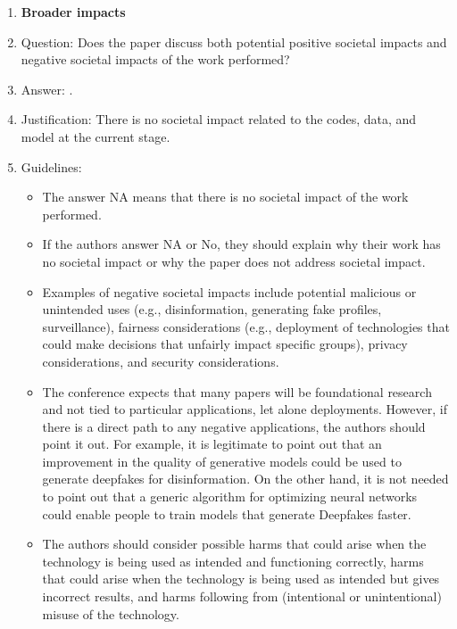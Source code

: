 \documentclass{article}
\begin{document}
\begin{enumerate}
\begin{itemize}
        \item If the authors answer No, they should explain the special circumstances that require a deviation from the Code of Ethics.
        \item The authors should make sure to preserve anonymity (e.g., if there is a special consideration due to laws or regulations in their jurisdiction).
    \end{itemize}
\item {\bf Broader impacts}
    \item[] Question: Does the paper discuss both potential positive societal impacts and negative societal impacts of the work performed?
    \item[] Answer: \answerNA{}.
    \item[] Justification: There is no societal impact related to the codes, data, and model at the current stage.
    \item[] Guidelines:
    \begin{itemize}
        \item The answer NA means that there is no societal impact of the work performed.
        \item If the authors answer NA or No, they should explain why their work has no societal impact or why the paper does not address societal impact.
        \item Examples of negative societal impacts include potential malicious or unintended uses (e.g., disinformation, generating fake profiles, surveillance), fairness considerations (e.g., deployment of technologies that could make decisions that unfairly impact specific groups), privacy considerations, and security considerations.
        \item The conference expects that many papers will be foundational research and not tied to particular applications, let alone deployments. However, if there is a direct path to any negative applications, the authors should point it out. For example, it is legitimate to point out that an improvement in the quality of generative models could be used to generate deepfakes for disinformation. On the other hand, it is not needed to point out that a generic algorithm for optimizing neural networks could enable people to train models that generate Deepfakes faster.
        \item The authors should consider possible harms that could arise when the technology is being used as intended and functioning correctly, harms that could arise when the technology is being used as intended but gives incorrect results, and harms following from (intentional or unintentional) misuse of the technology.

\end{itemize}
\end{enumerate}
\end{document}
